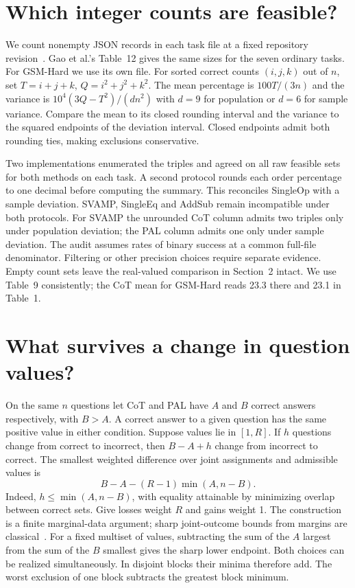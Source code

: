 \documentclass[10pt]{article}
\begin{document}
\section{Which integer counts are feasible?}
We count nonempty JSON records in each task file at a fixed repository revision~\cite{repo}. Gao et al.'s Table~12 gives the same sizes for the seven ordinary tasks. For GSM-Hard we use its own file. For sorted correct counts $(i,j,k)$ out of $n$, set $T=i+j+k$, $Q=i^2+j^2+k^2$. The mean percentage is $100T/(3n)$ and the variance is $10^4(3Q-T^2)/(dn^2)$ with $d=9$ for population or $d=6$ for sample variance. Compare the mean to its closed rounding interval and the variance to the squared endpoints of the deviation interval. Closed endpoints admit both rounding ties, making exclusions conservative.

Two implementations enumerated the triples and agreed on all raw feasible sets for both methods on each task. A second protocol rounds each order percentage to one decimal before computing the summary. This reconciles SingleOp with a sample deviation. SVAMP, SingleEq and AddSub remain incompatible under both protocols. For SVAMP the unrounded CoT column admits two triples only under population deviation; the PAL column admits one only under sample deviation. The audit assumes rates of binary success at a common full-file denominator. Filtering or other precision choices require separate evidence. Empty count sets leave the real-valued comparison in Section~2 intact. We use Table~9 consistently; the CoT mean for GSM-Hard reads 23.3 there and 23.1 in Table~1.



\section{What survives a change in question values?}
On the same $n$ questions let CoT and PAL have $A$ and $B$ correct answers respectively, with $B>A$. A correct answer to a given question has the same positive value in either condition. Suppose values lie in $[1,R]$. If $h$ questions change from correct to incorrect, then $B-A+h$ change from incorrect to correct. The smallest weighted difference over joint assignments and admissible values is
\[
 B-A-(R-1)\min(A,n-B).
\]
Indeed, $h\leq\min(A,n-B)$, with equality attainable by minimizing overlap between correct sets. Give losses weight $R$ and gains weight 1. The construction is a finite marginal-data argument; sharp joint-outcome bounds from margins are classical~\cite{tian}. For a fixed multiset of values, subtracting the sum of the $A$ largest from the sum of the $B$ smallest gives the sharp lower endpoint. Both choices can be realized simultaneously. In disjoint blocks their minima therefore add. The worst exclusion of one block subtracts the greatest block minimum.
\end{document}

